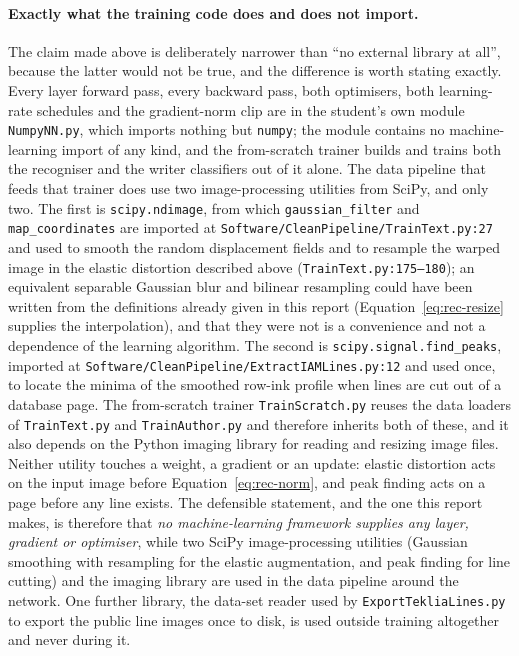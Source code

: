 \paragraph{Exactly what the training code does and does not import.}
The claim made above is deliberately narrower than ``no external library at all'', because the latter would not be true, and the difference is worth stating exactly.
Every layer forward pass, every backward pass, both optimisers, both learning-rate schedules and the gradient-norm clip are in the student's own module \texttt{NumpyNN.py}, which imports nothing but \texttt{numpy}; the module contains no machine-learning import of any kind, and the from-scratch trainer builds and trains both the recogniser and the writer classifiers out of it alone.
The data pipeline that feeds that trainer does use two image-processing utilities from SciPy, and only two.
The first is \texttt{scipy.ndimage}, from which \texttt{gaussian\_filter} and \texttt{map\_coordinates} are imported at \texttt{Software/CleanPipeline/TrainText.py:27} and used to smooth the random displacement fields and to resample the warped image in the elastic distortion described above (\texttt{TrainText.py:175--180}); an equivalent separable Gaussian blur and bilinear resampling could have been written from the definitions already given in this report (Equation~\ref{eq:rec-resize} supplies the interpolation), and that they were not is a convenience and not a dependence of the learning algorithm.
The second is \texttt{scipy.signal.find\_peaks}, imported at \texttt{Software/CleanPipeline/ExtractIAMLines.py:12} and used once, to locate the minima of the smoothed row-ink profile when lines are cut out of a database page.
The from-scratch trainer \texttt{TrainScratch.py} reuses the data loaders of \texttt{TrainText.py} and \texttt{TrainAuthor.py} and therefore inherits both of these, and it also depends on the Python imaging library for reading and resizing image files.
Neither utility touches a weight, a gradient or an update: elastic distortion acts on the input image before Equation~\ref{eq:rec-norm}, and peak finding acts on a page before any line exists.
The defensible statement, and the one this report makes, is therefore that \emph{no machine-learning framework supplies any layer, gradient or optimiser}, while two SciPy image-processing utilities (Gaussian smoothing with resampling for the elastic augmentation, and peak finding for line cutting) and the imaging library are used in the data pipeline around the network.
One further library, the data-set reader used by \texttt{ExportTekliaLines.py} to export the public line images once to disk, is used outside training altogether and never during it.

